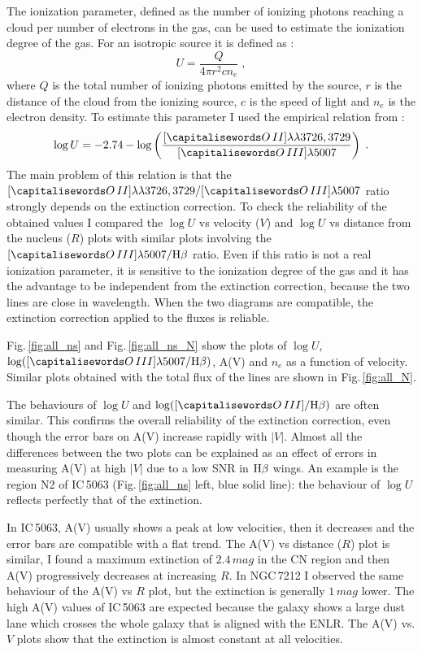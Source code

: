 \documentclass[../thesis.tex]{subfiles}
\begin{document}
The ionization parameter, defined as the number of ionizing photons reaching a cloud per number of electrons in the gas, can be used to estimate the ionization degree of the gas.
For an isotropic source it is defined as :
\begin{equation}
U=\frac{Q}{4\pi r^2 c n_e}\;,
\end{equation}
where $Q$ is the total number of ionizing photons emitted by the source, $r$ is the distance of the cloud from the ionizing source, $c$ is the speed of light and $n_e$ is the electron density.
To estimate this parameter I used the empirical relation from \citet{Penston90}:
\begin{equation}
\label{eq:U}
\log U= -2.74 - \log\left(\frac{[\ion{O}{II}]\lambda\lambda3726,3729}{[\ion{O}{III}]\lambda5007}\right)\;.
\end{equation}
The main problem of this relation is that the $[\ion{O}{II}]\lambda\lambda3726,3729/ [\ion{O}{III}]\lambda5007$ ratio strongly depends on the extinction correction.
To check the reliability of the obtained values I compared the $\log U$ vs velocity ($V$) and $\log U$ vs distance from the nucleus ($R$) plots with similar plots involving the $[\ion{O}{III}]\lambda5007/\Hb$ ratio.
Even if this ratio is not a real ionization parameter, it is sensitive to the ionization degree of the gas and it has the advantage to be independent from the extinction correction, because the two lines are close in wavelength.
When the two diagrams are compatible, the extinction correction applied to the fluxes is reliable.

Fig.\,\ref{fig:all_ns} and Fig.\,\ref{fig:all_ns_N} show the plots of  $\log U$, $\log([\ion{O}{III}]\lambda5007/\Hb)$, A(V) and $n_e$ as a function of velocity.
Similar plots obtained with the total flux of the lines are shown in Fig.\,\ref{fig:all_N}.

The behaviours of $\log U$ and $\log([\ion{O}{III}]/\Hb)$ are often similar.
This confirms the overall reliability of the extinction correction, even though the error bars on A(V) increase rapidly with $\lvert V \rvert$.
Almost all the differences between the two plots can be explained as an effect of errors in measuring A(V) at high $\lvert V \rvert$ due to a low SNR in $\rm H\beta$ wings.
An example is the region N2 of IC\,5063 (Fig.\,\ref{fig:all_ns} left, blue solid line):  the behaviour of $\log U$ reflects perfectly that of the extinction.

In IC\,5063, A(V) usually shows a peak at low velocities, then it decreases and the error bars are compatible with a flat trend.
The A(V) vs distance ($R$) plot is similar, I found a maximum extinction of $2.4\,\si{mag}$ in the CN region and then A(V) progressively decreases at increasing $R$.
In NGC\,7212 I observed the same behaviour of the A(V) vs $R$ plot, but the extinction is generally $1\,\si{mag}$ lower.
The high A(V) values of IC\,5063 are expected because the galaxy shows a large dust lane which crosses the whole galaxy that is aligned with the ENLR.
The A(V) vs. $V$ plots show that the extinction is almost constant at all velocities.
\end{document}

